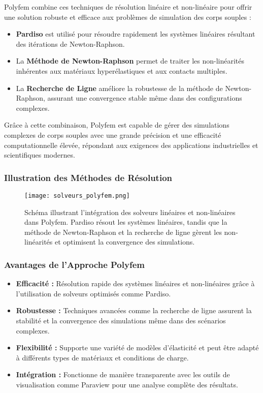 Polyfem combine ces techniques de résolution linéaire et non-linéaire pour offrir une solution robuste et efficace aux problèmes de simulation des corps souples :
\begin{itemize}
    \item \textbf{Pardiso} est utilisé pour résoudre rapidement les systèmes linéaires résultant des itérations de Newton-Raphson.
    \item La \textbf{Méthode de Newton-Raphson} permet de traiter les non-linéarités inhérentes aux matériaux hyperélastiques et aux contacts multiples.
    \item La \textbf{Recherche de Ligne} améliore la robustesse de la méthode de Newton-Raphson, assurant une convergence stable même dans des configurations complexes.
\end{itemize}

Grâce à cette combinaison, Polyfem est capable de gérer des simulations complexes de corps souples avec une grande précision et une efficacité computationnelle élevée, répondant aux exigences des applications industrielles et scientifiques modernes.

\subsubsection{Illustration des Méthodes de Résolution}

\begin{figure}[h]
    \centering
    \texttt{[image: solveurs\_polyfem.png]}
    \caption{Schéma illustrant l'intégration des solveurs linéaires et non-linéaires dans Polyfem. Pardiso résout les systèmes linéaires, tandis que la méthode de Newton-Raphson et la recherche de ligne gèrent les non-linéarités et optimisent la convergence des simulations.}
    \label{fig:solveurs_polyfem}
\end{figure}

\subsubsection{Avantages de l'Approche Polyfem}
\begin{itemize}
    \item \textbf{Efficacité :} Résolution rapide des systèmes linéaires et non-linéaires grâce à l'utilisation de solveurs optimisés comme Pardiso.
    \item \textbf{Robustesse :} Techniques avancées comme la recherche de ligne assurent la stabilité et la convergence des simulations même dans des scénarios complexes.
    \item \textbf{Flexibilité :} Supporte une variété de modèles d'élasticité et peut être adapté à différents types de matériaux et conditions de charge.
    \item \textbf{Intégration :} Fonctionne de manière transparente avec les outils de visualisation comme Paraview pour une analyse complète des résultats.
\end{itemize}

